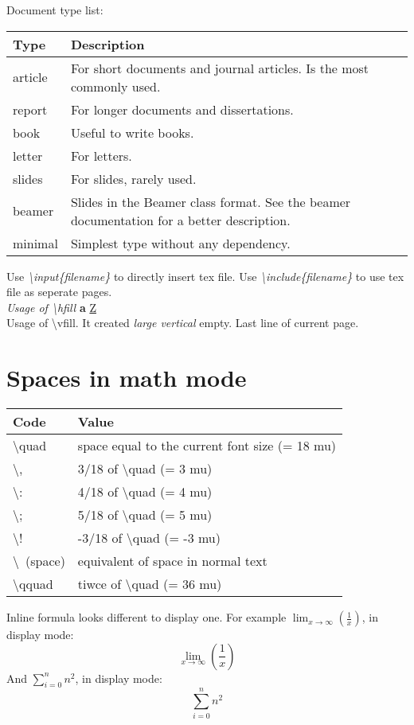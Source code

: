 \documentclass[openany]{book}
\begin{document}
{\scriptsize
Document type list:
\begin{center}
\begin{tabular}{|l|m{6cm}|} \hline
\textbf{Type} & \textbf{Description} \\\hline
article & For short documents and journal articles. Is the most commonly used. \\\hline
report & For longer documents and dissertations. \\\hline
book & Useful to write books. \\\hline
letter & For letters. \\\hline
slides & For slides, rarely used. \\\hline
beamer & Slides in the Beamer class format. See the beamer documentation for a better description. \\\hline
minimal & Simplest type without any dependency. \\\hline
\end{tabular}
\end{center}
}

{\tiny
Use \emph{\textbackslash{input}\{filename\}} to directly insert tex file.
Use \emph{\textbackslash{include}\{filename\}} to use tex file as seperate pages.\\
}
\textit{Usage of \textbackslash{hfill}} \hfill \textbf{a} \hfill \underline{Z}\\
Usage of \textbackslash{vfill}. It created \emph{large vertical} empty.
\vfill
Last line of current page.%

\chapter{Spaces in math mode}
\begin{center}
\begin{tabular}{l|m{6cm}}
\textbf{Code} & \textbf{Value} \\\hline
\textbackslash{quad} & space equal to the current font size (= 18 mu) \\\hline
\textbackslash{,} & 3/18 of \textbackslash{quad} (= 3 mu) \\\hline
\textbackslash{:} & 4/18 of \textbackslash{quad} (= 4 mu) \\\hline
\textbackslash{;} & 5/18 of \textbackslash{quad} (= 5 mu) \\\hline
\textbackslash{!} & -3/18 of \textbackslash{quad} (= -3 mu) \\\hline
\textbackslash\ (space) & equivalent of space in normal text \\\hline
\textbackslash{qquad} & tiwce of \textbackslash{quad} (= 36 mu) \\
\end{tabular}
\end{center}
Inline formula looks different to display one. For example $\lim_{x \rightarrow \infty}(\frac{1}{x})$, in display mode:
$$\lim_{x \rightarrow \infty}(\frac{1}{x})$$
And $\sum_{i=0}^{n} n^2$, in display mode:
$$\sum_{i=0}^{n} n^2$$
\end{document}

